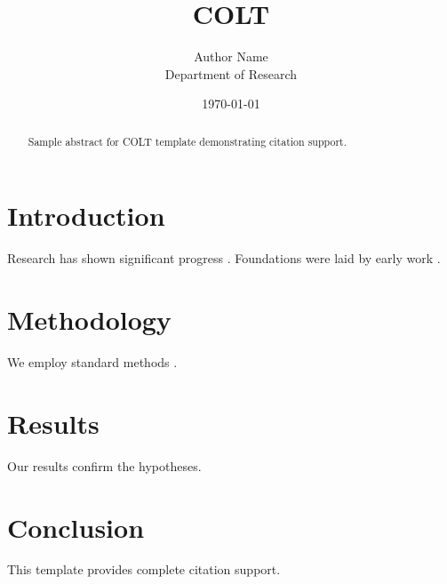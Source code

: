 \documentclass{article}
\title{COLT}
\author{Author Name \\ \small Department of Research}
\date{\today}
\begin{document}
\maketitle

\begin{abstract}
Sample abstract for COLT template demonstrating citation support.
\end{abstract}

\section{Introduction}
Research has shown significant progress \citep{einstein1905}. Foundations were laid by early work \citep{turing1950}.

\section{Methodology}
We employ standard methods \citep{knuth1984}.

\section{Results}
Our results confirm the hypotheses.

\section{Conclusion}
This template provides complete citation support.



\end{document}
